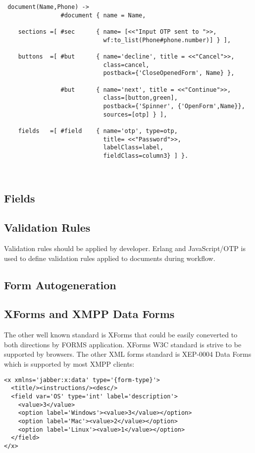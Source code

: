 \vspace{1\baselineskip}
\begin{lstlisting}
 document(Name,Phone) ->
                #document { name = Name,

    sections =[ #sec      { name= [<<"Input OTP sent to ">>,
                            wf:to_list(Phone#phone.number)] } ],

    buttons  =[ #but      { name='decline', title = <<"Cancel">>, 
                            class=cancel,
                            postback={'CloseOpenedForm', Name} },

                #but      { name='next', title = <<"Continue">>, 
                            class=[button,green],
                            postback={'Spinner', {'OpenForm',Name}},
                            sources=[otp] } ],

    fields   =[ #field    { name='otp', type=otp,
                            title= <<"Password">>,
                            labelClass=label,
                            fieldClass=column3} ] }.
\end{lstlisting}

\

\subsection{Fields}

\subsection{Validation Rules}
Validation rules should be applied by developer.
Erlang and JavaScript/OTP is used to define validation
rules applied to documents during workflow.

\subsection{Form Autogeneration}

\subsection{XForms and XMPP Data Forms}
The other well known standard is XForms that could be easily coneverted
to both directions by FORMS application. XForms W3C standard is strive to be supported by browsers.
The other XML forms standard is XEP-0004 Data Forms which is supported by most XMPP clients:

\vspace{1\baselineskip}
\begin{lstlisting}
<x xmlns='jabber:x:data' type='{form-type}'>
  <title/><instructions/><desc/>
  <field var='OS' type='int' label='description'>
    <value>3</value>
    <option label='Windows'><value>3</value></option>
    <option label='Mac'><value>2</value></option>
    <option label='Linux'><value>1</value></option>
  </field>
</x>
\end{lstlisting}
